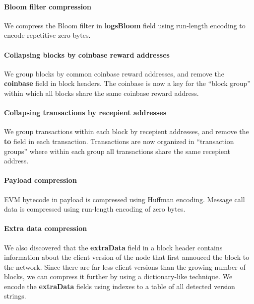 \paragraph{Bloom filter compression} We compress the Bloom filter in \textbf{logsBloom} field using run-length
encoding to encode repetitive zero bytes.

\paragraph{Collapsing blocks by coinbase reward addresses} We group blocks by common coinbase reward addresses, and remove
the \textbf{coinbase} field in block headers. The coinbase is now a key for the ``block group'' within which all blocks
share the same coinbase reward address.

\paragraph{Collapsing transactions by recepient addresses} We group transactions within each block by recepient addresses, and
remove the \textbf{to} field in each transaction. Transactions are now organized in ``transaction groups'' where within
each group all transactions share the same recepient address.

\paragraph{Payload compression} EVM bytecode in payload is compressed using Huffman encoding. Message call data is compressed
using run-length encoding of zero bytes.

\paragraph{Extra data compression} We also discovered that the \textbf{extraData} field in a block header contains information
about the client version of the node that first annouced the block to the network. Since there are far less client versions
than the growing number of blocks, we can compress it further by using a dictionary-like technique. We encode the
\textbf{extraData} fields using indexes to a table of all detected version strings.
